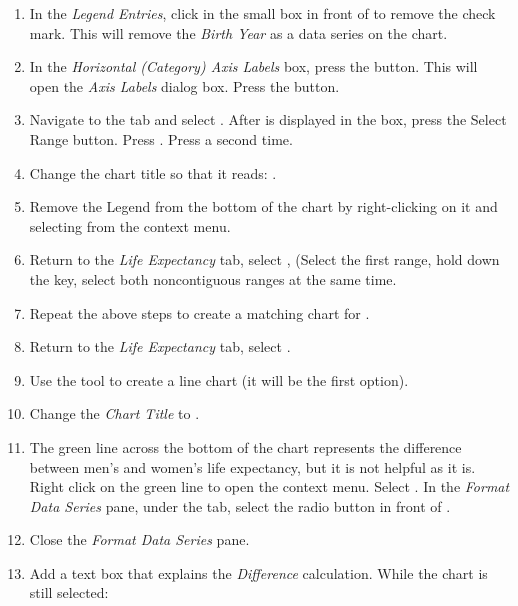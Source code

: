 \begin{enumerate}[resume]
	\item In the \textit{Legend Entries}, click in the small box in front of  to remove the check mark. This will remove the \textit{Birth Year} as a data series on the chart.
	\item In the \textit{Horizontal (Category) Axis Labels} box, press the  button. This will open the \textit{Axis Labels} dialog box. Press the  button.
	\item Navigate to the  tab and select . After  is displayed in the box, press the Select Range button. Press . Press  a second time.
	\item Change the chart title so that it reads: .
	\item Remove the Legend from the bottom of the chart by right-clicking on it and selecting  from the context menu.
	\item Return to the \textit{Life Expectancy} tab, select ,  (Select the first range, hold down the  key, select both noncontiguous ranges at the same time.
	\item Repeat the above steps to create a matching chart for .
	\item Return to the \textit{Life Expectancy} tab, select .
	\item Use the  tool to create a line chart (it will be the first option).
	\item Change the \textit{Chart Title} to .
	\item The green line across the bottom of the chart represents the difference between men's and women's life expectancy, but it is not helpful as it is. Right click on the green line to open the context menu. Select . In the \textit{Format Data Series} pane, under the  tab, select the radio button in front of .
	\item Close the \textit{Format Data Series} pane.
	\item Add a text box that explains the \textit{Difference} calculation. While the chart is still selected:
	

\end{enumerate}
